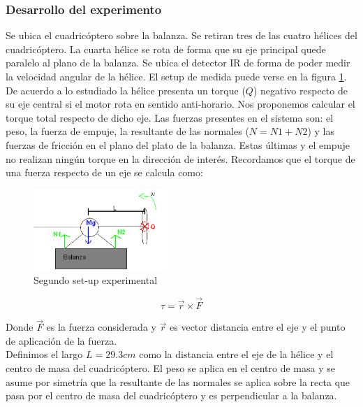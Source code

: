 \documentclass[main]{subfiles}
\begin{document}
\subsubsection*{Desarrollo del experimento}
\label{sub:torque}
Se ubica el cuadric\'optero sobre la balanza. Se retiran tres de las cuatro h\'elices del cuadric\'optero. La cuarta h\'elice se rota de forma que su eje principal quede paralelo al plano de la balanza. Se ubica el detector IR de forma de poder medir la velocidad angular de la h\'elice. El setup de medida puede verse en la figura \ref{fig:setup2}. De acuerdo a lo estudiado la h\'elice presenta un torque ($Q$) negativo respecto de su eje central si el motor rota en sentido anti-horario. Nos proponemos calcular el torque total respecto de dicho eje. Las fuerzas presentes en el sistema son: el peso, la fuerza de empuje, la resultante de las normales ($N = N1+N2$) y las fuerzas de fricci\'on en el plano del plato de la balanza. Estas \'ultimas y el empuje no realizan ning\'un torque en la direcci\'on de inter\'es. Recordamos que el torque de una fuerza respecto de un eje se calcula como:
\begin{figure}
  \vspace{0pt}
  \begin{center}
    \includegraphics[width=0.45\textwidth]{./pics_motores/set2.pdf}
  \end{center}
  \vspace{-15pt}
  \caption{Segundo set-up experimental}
  \label{fig:setup2}
  \vspace{10pt}
\end{figure}
\begin{equation}
\tau=\vec{r} \times \vec{F} 
\end{equation}

Donde $\vec{F}$ es la fuerza considerada y $\vec{r}$ es vector distancia entre el eje y el punto de aplicaci\'on de la fuerza.\\

Definimos el largo $L=29.3cm$ como la distancia entre el eje de la h\'elice y el centro de masa del cuadric\'optero. El peso se aplica en el centro de masa y se asume por simetr\'ia que la resultante de las normales se aplica sobre la recta que pasa por el centro de masa del cuadric\'optero y es perpendicular a la balanza. 
\end{document}
